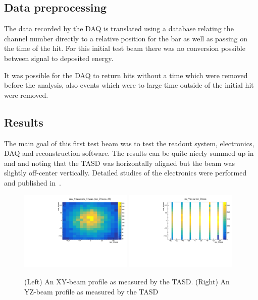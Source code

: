 
\subsection{Data preprocessing}

The data recorded by the DAQ is translated using a database relating the channel number directly to a relative position for the bar as well as passing on the time of the hit. For this initial test beam there was no conversion possible between signal to deposited energy.

It was possible for the DAQ to return hits without a time which were removed before the analysis, also events which were to large time outside of the initial hit were removed.

\subsection{Results}

The main goal of this first test beam was to test the readout system, electronics, DAQ and reconstruction software. The results can be quite nicely summed up in  and  and noting that the TASD was horizontally aligned but the beam was slightly off-center vertically. Detailed studies of the electronics were performed and published in~\cite{52Georgi}.

\begin{figure}[h!]
\centering
\includegraphics[width=0.48\textwidth]{figures/nuphys/newFigures/beamXYplane1Hadron.pdf}
\includegraphics[width=0.48\textwidth]{figures/nuphys/newFigures/beamYZhadron.pdf}
\caption{(Left) An XY-beam profile as measured by the TASD. (Right) An YZ-beam profile as measured by the TASD}
\label{fig:TASDres2}
\end{figure}

